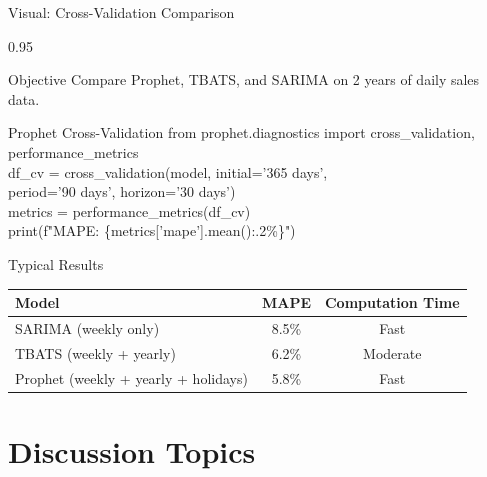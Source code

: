 \documentclass[9pt, aspectratio=169, t]{beamer}
\begin{document}
\begin{frame}{Visual: Cross-Validation Comparison}
    \begin{cminipage}{0.95\textwidth}
    \vspace{-0.3cm}
    {\footnotesize
    \begin{block}{Objective}
        Compare Prophet, TBATS, and SARIMA on 2 years of daily sales data.
    \end{block}
    \begin{exampleblock}{Prophet Cross-Validation}
        {\scriptsize\ttfamily
        from prophet.diagnostics import cross\_validation, performance\_metrics\\[0.3em]
        df\_cv = cross\_validation(model, initial='365 days',\\
        \quad period='90 days', horizon='30 days')\\
        metrics = performance\_metrics(df\_cv)\\
        print(f"MAPE: \{metrics['mape'].mean():.2\%\}")
        }
    \end{exampleblock}
    \begin{block}{Typical Results}
        \begin{center}
        \begin{tabular}{lcc}
            \toprule
            Model & MAPE & Computation Time \\
            \midrule
            SARIMA (weekly only) & 8.5\% & Fast \\
            TBATS (weekly + yearly) & 6.2\% & Moderate \\
            Prophet (weekly + yearly + holidays) & 5.8\% & Fast \\
            \bottomrule
        \end{tabular}
        \end{center}
    \end{block}
    }
    \end{cminipage}
\end{frame}

\section{Discussion Topics}
\end{document}

